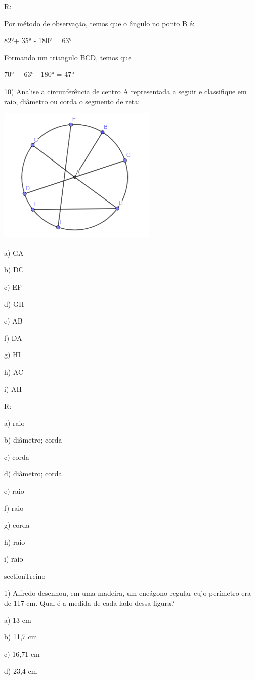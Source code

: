 R:

Por método de observação, temos que o ângulo no ponto B é:

82°+ 35° - 180° = 63°

Formando um triangulo BCD, temos que

70° + 63° - 180° = 47°

10) Analise a circunferência de centro A representada a seguir e
classifique em raio, diâmetro ou corda o segmento de reta:

\includegraphics[width=2.98681in,height=2.57292in]{./imgSAEB_8_MAT/media/image12.png}

a) GA

b) DC

c) EF

d) GH

e) AB

f) DA

g) HI

h) AC

i) AH

R:

a) raio

b) diâmetro; corda

c) corda

d) diâmetro; corda

e) raio

f) raio

g) corda

h) raio

i) raio

section{Treino}

1) Alfredo desenhou, em uma madeira, um eneágono regular cujo perímetro
era de 117 cm. Qual é a medida de cada lado dessa figura?

a) 13 cm

b) 11,7 cm

c) 16,71 cm

d) 23,4 cm

